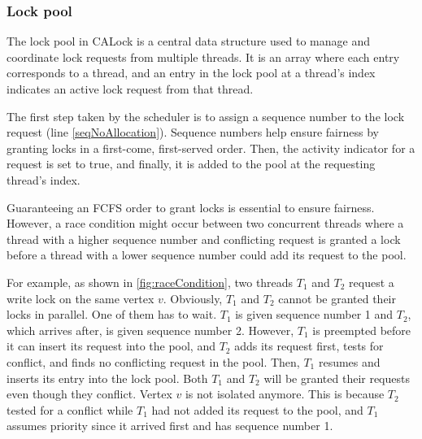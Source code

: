 \subsubsection{Lock pool}
The lock pool in CALock is a central data structure used to manage and coordinate lock requests from multiple threads. It is an array where each entry corresponds to a thread, and an entry in the lock pool at a thread's index indicates an active lock request from that thread.

The first step taken by the scheduler is to assign a sequence number to the lock request (line \ref{seqNoAllocation}). Sequence numbers help ensure fairness by granting locks in a first-come, first-served order. Then, the activity indicator for a request is set to true, and finally, it is added to the pool at the requesting thread's index. 


Guaranteeing an FCFS order to grant locks is essential to ensure fairness. However, a race condition might occur between two concurrent threads where a thread with a higher sequence number and conflicting request is granted a lock before a thread with a lower sequence number could add its request to the pool. 

For example, as shown in \cref{fig:raceCondition}, two threads $T_1$ and $T_2$ request a write lock on the same vertex $v$. Obviously, $T_1$ and $T_2$ cannot be granted their locks in parallel. One of them has to wait. $T_1$ is given sequence number 1 and $T_2$, which arrives after, is given sequence number 2. However, $T_1$ is preempted before it can insert its request into the pool, and $T_2$ adds its request first, tests for conflict, and finds no conflicting request in the pool. Then, $T_1$ resumes and inserts its entry into the lock pool. 
Both $T_1$ and $T_2$ will be granted their requests even though they conflict. Vertex $v$ is not isolated anymore. This is because $T_2$ tested for a conflict while $T_1$ had not added its request to the pool, and $T_1$ assumes priority since it arrived first and has sequence number 1.

